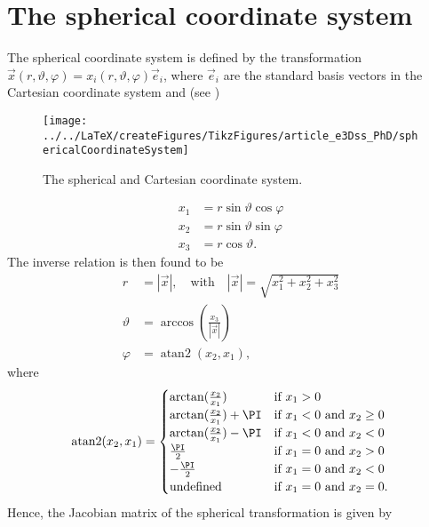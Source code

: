 \section{The spherical coordinate system}
\label{Sec1:sphericalCoordinates}
The spherical coordinate system is defined by the transformation $\vec{x}(r,\vartheta,\varphi)=x_i(r,\vartheta,\varphi)\vec{e}_i$, where $\vec{e}_i$ are the standard basis vectors in the Cartesian coordinate system and (see )
\begin{figure}
	\centering
	\texttt{[image: ../../LaTeX/createFigures/TikzFigures/article\_e3Dss\_PhD/sphericalCoordinateSystem]}
	\caption{The spherical and Cartesian coordinate system.}
	\label{Fig1:SphericalCoordinateSystem}
\end{figure}
\begin{align}
	x_1 &= r\sin\vartheta\cos\varphi\\
	x_2 &= r\sin\vartheta\sin\varphi\\
	x_3 &= r\cos\vartheta.
\end{align}
The inverse relation is then found to be
\begin{align}
	r &= |\vec{x}|,\quad\text{with}\quad |\vec{x}|=\sqrt{x_1^2+x_2^2+x_3^2}\\
	\vartheta &= \arccos\left(\frac{x_3}{|\vec{x}|}\right)\\
	\varphi &= \operatorname{atan2}(x_2,x_1),
\end{align}
where
\begin{equation}
	\operatorname{atan2}(x_2,x_1) = \begin{cases}
	\arctan(\frac{x_2}{x_1}) & \mbox{if } x_1 > 0\\
	\arctan(\frac{x_2}{x_1}) + \PI & \mbox{if } x_1 < 0 \mbox{ and } x_2 \ge 0\\
	\arctan(\frac{x_2}{x_1}) - \PI & \mbox{if } x_1 < 0 \mbox{ and } x_2 < 0\\
	\frac{\PI}{2} & \mbox{if } x_1 = 0 \mbox{ and } x_2 > 0\\
	-\frac{\PI}{2} & \mbox{if } x_1 = 0 \mbox{ and } x_2 < 0\\
	\text{undefined} & \mbox{if } x_1 = 0 \mbox{ and } x_2 = 0.
	\end{cases}
\end{equation}
Hence, the Jacobian matrix of the spherical transformation is given by
